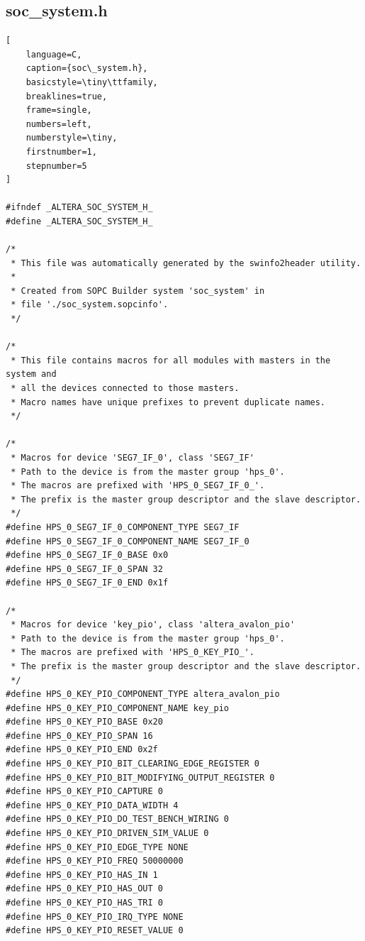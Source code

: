 \documentclass[conference]{IEEEtran}
\begin{document}
\subsection{soc\_system.h}

\begin{lstlisting}[
    language=C, 
    caption={soc\_system.h}, 
    basicstyle=\tiny\ttfamily, 
    breaklines=true, 
    frame=single, 
    numbers=left, 
    numberstyle=\tiny, 
    firstnumber=1, 
    stepnumber=5
]

#ifndef _ALTERA_SOC_SYSTEM_H_
#define _ALTERA_SOC_SYSTEM_H_

/*
 * This file was automatically generated by the swinfo2header utility.
 * 
 * Created from SOPC Builder system 'soc_system' in
 * file './soc_system.sopcinfo'.
 */

/*
 * This file contains macros for all modules with masters in the system and
 * all the devices connected to those masters.
 * Macro names have unique prefixes to prevent duplicate names.
 */

/*
 * Macros for device 'SEG7_IF_0', class 'SEG7_IF'
 * Path to the device is from the master group 'hps_0'.
 * The macros are prefixed with 'HPS_0_SEG7_IF_0_'.
 * The prefix is the master group descriptor and the slave descriptor.
 */
#define HPS_0_SEG7_IF_0_COMPONENT_TYPE SEG7_IF
#define HPS_0_SEG7_IF_0_COMPONENT_NAME SEG7_IF_0
#define HPS_0_SEG7_IF_0_BASE 0x0
#define HPS_0_SEG7_IF_0_SPAN 32
#define HPS_0_SEG7_IF_0_END 0x1f

/*
 * Macros for device 'key_pio', class 'altera_avalon_pio'
 * Path to the device is from the master group 'hps_0'.
 * The macros are prefixed with 'HPS_0_KEY_PIO_'.
 * The prefix is the master group descriptor and the slave descriptor.
 */
#define HPS_0_KEY_PIO_COMPONENT_TYPE altera_avalon_pio
#define HPS_0_KEY_PIO_COMPONENT_NAME key_pio
#define HPS_0_KEY_PIO_BASE 0x20
#define HPS_0_KEY_PIO_SPAN 16
#define HPS_0_KEY_PIO_END 0x2f
#define HPS_0_KEY_PIO_BIT_CLEARING_EDGE_REGISTER 0
#define HPS_0_KEY_PIO_BIT_MODIFYING_OUTPUT_REGISTER 0
#define HPS_0_KEY_PIO_CAPTURE 0
#define HPS_0_KEY_PIO_DATA_WIDTH 4
#define HPS_0_KEY_PIO_DO_TEST_BENCH_WIRING 0
#define HPS_0_KEY_PIO_DRIVEN_SIM_VALUE 0
#define HPS_0_KEY_PIO_EDGE_TYPE NONE
#define HPS_0_KEY_PIO_FREQ 50000000
#define HPS_0_KEY_PIO_HAS_IN 1
#define HPS_0_KEY_PIO_HAS_OUT 0
#define HPS_0_KEY_PIO_HAS_TRI 0
#define HPS_0_KEY_PIO_IRQ_TYPE NONE
#define HPS_0_KEY_PIO_RESET_VALUE 0


\end{lstlisting}
\end{document}
